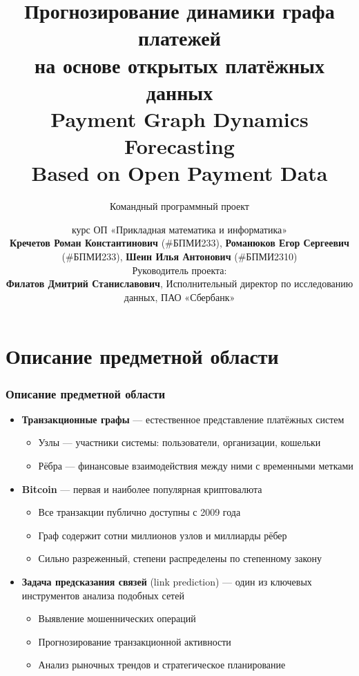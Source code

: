 \documentclass[aspectratio=169]{beamer}
\title[Прогнозирование платёжных графов]{%
  \fontsize{11}{13}\selectfont Прогнозирование динамики графа платежей\\
  \fontsize{11}{13}\selectfont на основе открытых платёжных данных\\[0.2cm]
  \fontsize{9}{11}\selectfont Payment Graph Dynamics Forecasting\\
  \fontsize{9}{11}\selectfont Based on Open Payment Data
}
\subtitle{\fontsize{9}{11}\selectfont Командный программный проект}
\author[Кречетов, Романюков, Шеин]{%
  \fontsize{8}{10}\selectfont
  3 курс ОП «Прикладная математика и информатика»\\
  \textbf{Кречетов Роман Константинович} (\#БПМИ233),
  \textbf{Романюков Егор Сергеевич} (\#БПМИ233),
  \textbf{Шеин Илья Антонович} (\#БПМИ2310)\\[0.2cm]
  Руководитель проекта:\\
  \textbf{Филатов Дмитрий Станиславович},
  Исполнительный директор по исследованию данных, ПАО «Сбербанк»
}
\institute[НИУ ВШЭ]{%
  Национальный исследовательский университет\\
  «Высшая школа экономики»
}
\date{}
\begin{document}
\frame[plain]{\titlepage}


\section{Описание предметной области}
\begin{frame}
  \frametitle{Описание предметной области}
  \begin{itemize}
    \item \textbf{Транзакционные графы} — естественное представление платёжных систем
      \begin{itemize}
        \item Узлы — участники системы: пользователи, организации, кошельки
        \item Рёбра — финансовые взаимодействия между ними с временными метками
      \end{itemize}
    \item \textbf{Bitcoin} — первая и наиболее популярная криптовалюта
      \begin{itemize}
        \item Все транзакции публично доступны с 2009 года
        \item Граф содержит сотни миллионов узлов и миллиарды рёбер
        \item Сильно разреженный, степени распределены по степенному закону
      \end{itemize}
    \item \textbf{Задача предсказания связей} (link prediction) — один из ключевых инструментов анализа подобных сетей
      \begin{itemize}
        \item Выявление мошеннических операций
        \item Прогнозирование транзакционной активности
        \item Анализ рыночных трендов и стратегическое планирование
      \end{itemize}
  \end{itemize}
\end{frame}

\end{document}
